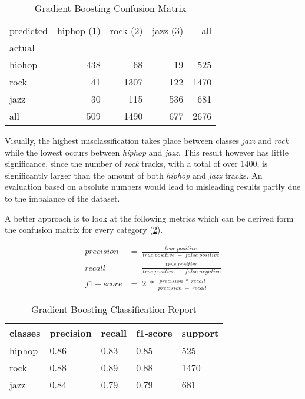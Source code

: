 \begin{table}[H]
  \centering
  \begin{tabular}{lrrrr}
    \toprule
    predicted & hiphop (1) & rock (2) & jazz (3) &   all \\
    actual &      &       &      &       \\
    \midrule
    hiohop &  438 &    68 &   19 &   525 \\
    rock   &   41 &  1307 &  122 &  1470 \\
    jazz   &   30 &   115 &  536 &   681 \\
    all    &  509 &  1490 &  677 &  2676 \\
    \bottomrule
    \end{tabular}
  \caption{Gradient Boosting Confusion Matrix}%
  \label{tbl:gb_confusion_matrix}%
\end{table} 

Visually, the highest misclassification takes place between classes \emph{jazz} and \emph{rock} while the lowest occurs
between \emph{hiphop} and \emph{jazz}. This result however has little significance, since the number of \emph{rock} tracks, with a total of over 
\(1400\), is significantly larger than the amount of both \emph{hiphop} and \emph{jazz} tracks. An evaluation based on absolute numbers would lead to 
misleading results partly due to the imbalance of the dataset. 

A better approach is to look at the following metrics which can be derived form the confusion matrix for every category \cite[p. 235]{Davis_2006} \cite[p. 862]{fawcett2006introduction}(\ref{tbl:gb_classification_Report}). 

\begin{equation*}
  \begin{aligned}
    precision &= \;\frac{true\:positive}{true\:positive\;+\;false\:positive}
    \\
    recall &= \;\frac{true\:positive}{true\:positive\;+\;false\:negative}
    \\
    f1-score &= \;2\;*\;\frac{precision\;*\;recall}{precision\;+\;recall}
  \end{aligned}
\end{equation*}

\begin{table}[H]
  \centering
  \begin{tabular}{lllll}
    \toprule
    classes & precision & recall & f1-score & support \\
    \midrule
     hiphop &      0.86 &   0.83 &     0.85 &     525 \\
       rock &      0.88 &   0.89 &     0.88 &    1470 \\
       jazz &      0.84 &   0.79 &     0.79 &     681 \\
    \bottomrule
    \end{tabular}
  \caption{Gradient Boosting Classification Report}%
  \label{tbl:gb_classification_Report}%
\end{table} 


